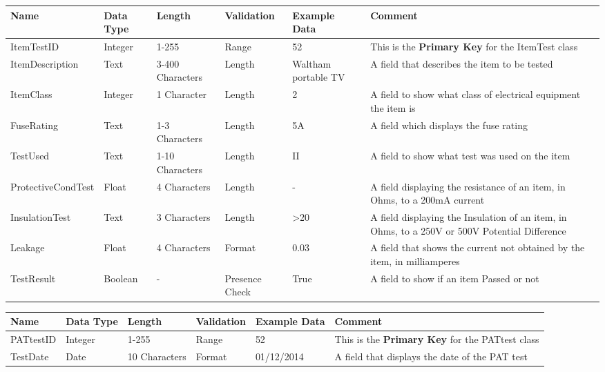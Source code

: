\begin{landscape}
    \begin{center}
        \begin{tabular}{|p{3.4cm}|p{2cm}|p{2cm}|p{2cm}|p{4cm}|p{5cm}|}
            \hline
            \textbf{Name} & \textbf{Data Type} & \textbf{Length} & \textbf{Validation} & \textbf{Example Data} & \textbf{Comment} \\ \hline
            ItemTestID & Integer & 1-255 & Range & 52 & This is the \textbf{Primary Key} for the ItemTest class \\ \hline
            ItemDescription & Text & 3-400 Characters & Length & Waltham portable TV & A field that describes the item to be tested \\ \hline
            ItemClass & Integer & 1 Character & Length & 2 & A field to show what class of electrical equipment the item is \\ \hline
            FuseRating & Text & 1-3 Characters & Length & 5A & A field which displays the fuse rating \\ \hline
            TestUsed & Text & 1-10 Characters & Length & II & A field to show what test was used on the item \\ \hline
            ProtectiveCondTest & Float & 4 Characters & Length & - & A field displaying the resistance of an item, in Ohms, to a 200mA current  \\ \hline
            InsulationTest & Text & 3 Characters & Length & >20 & A field displaying the Insulation of an item, in Ohms, to a 250V or 500V Potential Difference \\ \hline
            Leakage & Float & 4 Characters & Format & 0.03 & A field that shows the current not obtained by the item, in milliamperes \\ \hline
            TestResult & Boolean & - & Presence Check & True & A field to show if an item Passed or not\\ \hline
        \end{tabular}
    \end{center}
\end{landscape}

\begin{landscape}
    \begin{center}
        \begin{tabular}{|p{2.3cm}|p{2cm}|p{3cm}|p{2cm}|p{4.6cm}|p{4cm}|}
            \hline
            \textbf{Name} & \textbf{Data Type} & \textbf{Length} & \textbf{Validation} & \textbf{Example Data} & \textbf{Comment} \\ \hline
            PATtestID & Integer & 1-255 & Range & 52 & This is the \textbf{Primary Key} for the PATtest class \\ \hline
            TestDate & Date & 10 Characters & Format & 01/12/2014 & A field that displays the date of the PAT test \\ \hline
        \end{tabular}
    \end{center}
\end{landscape}

